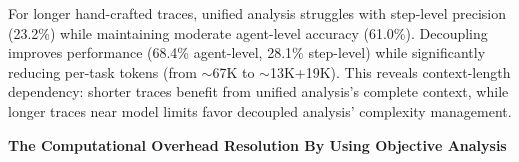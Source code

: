 \documentclass{article}
\begin{document}

For longer hand-crafted traces, unified analysis struggles with step-level precision (23.2\%) while maintaining moderate agent-level accuracy (61.0\%). Decoupling improves performance (68.4\% agent-level, 28.1\% step-level) while significantly reducing per-task tokens (from $\sim$67K to $\sim$13K+19K). This reveals context-length dependency: shorter traces benefit from unified analysis's complete context, while longer traces near model limits favor decoupled analysis' complexity management.

\textbf{The Computational Overhead Resolution By Using Objective Analysis}
\end{document}
